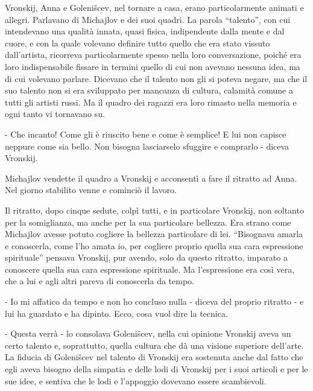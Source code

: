 Vronskij, Anna e Golenišcev, nel tornare a casa, erano particolarmente animati e allegri. Parlavano di Michajlov e dei suoi quadri. La parola ``talento'', con cui intendevano una qualità innata, quasi fisica, indipendente dalla mente e dal cuore, e con la quale volevano definire tutto quello che era stato vissuto dall'artista, ricorreva particolarmente spesso nella loro conversazione, poiché era loro indispensabile fissare in termini quello di cui non avevano nessuna idea, ma di cui volevano parlare. Dicevano che il talento non gli si poteva negare, ma che il suo talento non si era sviluppato per mancanza di cultura, calamità comune a tutti gli artisti russi. Ma il quadro dei ragazzi era loro rimasto nella memoria e ogni tanto vi tornavano su. 

- Che incanto! Come gli è riuscito bene e come è semplice! E lui non capisce neppure come sia bello. Non bisogna lasciarselo sfuggire e comprarlo - diceva Vronskij. 

\label{xiii-4} 

Michajlov vendette il quadro a Vronskij e acconsentì a fare il ritratto ad Anna. Nel giorno stabilito venne e cominciò il lavoro. 

Il ritratto, dopo cinque sedute, colpì tutti, e in particolare Vronskij, non soltanto per la somiglianza, ma anche per la sua particolare bellezza. Era strano come Michajlov avesse potuto cogliere la bellezza particolare di lei. ``Bisognava amarla e conoscerla, come l'ho amata io, per cogliere proprio quella sua cara espressione spirituale'' pensava Vronskij, pur avendo, solo da questo ritratto, imparato a conoscere quella sua cara espressione spirituale. Ma l'espressione era così vera, che a lui e agli altri pareva di conoscerla da tempo. 

- Io mi affatico da tempo e non ho concluso nulla - diceva del proprio ritratto - e lui ha guardato e ha dipinto. Ecco, cosa vuol dire la tecnica. 

- Questa verrà - lo consolava Golenišcev, nella cui opinione Vronskij aveva un certo talento e, soprattutto, quella cultura che dà una visione superiore dell'arte. La fiducia di Golenišcev nel talento di Vronskij era sostenuta anche dal fatto che egli aveva bisogno della simpatia e delle lodi di Vronskij per i suoi articoli e per le sue idee, e sentiva che le lodi e l'appoggio dovevano essere scambievoli. 

